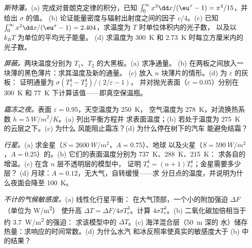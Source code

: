 \begin{exercise}[$\star\star$]\label{exo:b2:thermal-radiation:7}
\emph{斯特藩。}(a) 完成对普朗克定律的积分，已知
$\int_0^\infty x^3\dd x/(\eu^x - 1) = \pi^4/15$，并给出 $\sigma$ 的值。
(b) 论证能量密度与辐射出射度之间的因子 $c/4$。(c) 已知
$\int_0^\infty x^2\dd x/(\eu^x - 1) = 2.404$，求温度为 $T$ 时单位体积内的光子数，
以及以 $k_BT$ 为单位的平均光子能量。
(d) 求温度为 \qty{300}{K} 和 \qty{2.73}{K} 时每立方厘米内的光子数。
\end{exercise}

\begin{exercise}[$\star\star$]\label{exo:b2:thermal-radiation:8}
\emph{屏蔽。}两块温度分别为 $T_1$、$T_2$ 的大黑板。(a) 求净通量。
(b) 在两板之间放入一块薄的黑色薄片：求其温度及新的通量。
(c) 放入 $n$ 块薄片的情形。(d) 为 $\varepsilon$ 的灰板：
证明通量为 $\sigma(T_1^4 - T_2^4)/(2/\varepsilon - 1)$，
并对抛光表面（$\varepsilon = 0.05$）分别在 \qty{300}{K} 和
\qty{77}{K} 下计算该值——即真空保温瓶。
\end{exercise}

\begin{exercise}[$\star\star$]\label{exo:b2:thermal-radiation:9}
\emph{霜冻之夜。}表面 $\varepsilon = 0.95$，天空温度为 \qty{250}{K}，
空气温度为 \qty{278}{K}，对流换热系数 $h = \qty{5}{W/m^2/K}$。(a) 列出平衡方程并
求表面温度；(b) 若处于温度为 \qty{275}{K} 的云层之下。(c) 为什么
风能阻止霜冻？(d) 为什么停在树下的汽车
能避免结霜？
\end{exercise}

\begin{exercise}[$\star\star\star$]\label{exo:b2:thermal-radiation:10}
\emph{行星。}(a) 求金星（$S = \qty{2600}{W/m^2}$，$A = 0.75$）、地球
以及火星（$S = \qty{590}{W/m^2}$，$A = 0.25$）的。(b) 它们的表面温度分别为
\qty{737}{K}、\qty{288}{K}、\qty{215}{K}：
求各自的增温。(c) 在含 $n$ 层不透明层的模型中，
证明 $T_{\text{s}}^4 = (n + 1)T_{\text{e}}^4$；金星需要多少层？
(d) 月球：$A = 0.12$，无大气，自转缓慢——求
分日点的温度，并说明为什么夜面会降至 \qty{100}{K}。
\end{exercise}

\begin{exercise}[$\star\star\star$]\label{exo:b2:thermal-radiation:11}
\emph{不计的气候敏感度。}(a) 线性化行星平衡：
在大气顶部，一个小的附加强迫 $\Delta F$（单位为 \unit{W/m^2}）
使升高 $\Delta T
= \Delta F/4\sigma T_{\text{e}}^3$。计算 $4\sigma T_{\text{e}}^3$。(b)
二氧化碳加倍相当于约 \qty{3.7}{W/m^2} 的强迫：
求该模型中的 $\Delta T$。(c) 海洋混合层（\qty{50}{m} 深的
水）储存热量：求响应的时间常数。(d) 为什么水汽
和冰反照率使真实的敏感度大于
(b) 中的结果？
\end{exercise}


